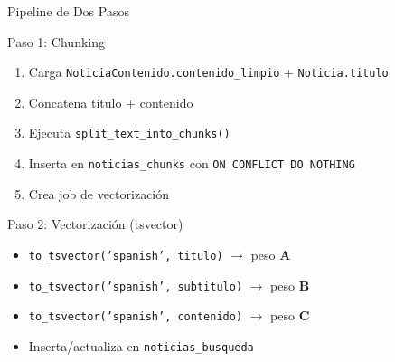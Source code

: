\documentclass[11pt,aspectratio=169,spanish]{beamer}
\begin{document}
\begin{frame}[fragile]{Pipeline de Dos Pasos}
    \begin{block}{Paso 1: Chunking}
        \begin{enumerate}
            \item Carga \texttt{NoticiaContenido.contenido\_limpio} + \texttt{Noticia.titulo}
            \item Concatena título + contenido
            \item Ejecuta \texttt{split\_text\_into\_chunks()}
            \item Inserta en \texttt{noticias\_chunks} con \texttt{ON CONFLICT DO NOTHING}
            \item Crea job de vectorización
        \end{enumerate}
    \end{block}

    \vspace{0.3cm}
    \begin{block}{Paso 2: Vectorización (tsvector)}
        \begin{itemize}
            \item \texttt{to\_tsvector('spanish', titulo)} $\to$ peso \textbf{A}
            \item \texttt{to\_tsvector('spanish', subtitulo)} $\to$ peso \textbf{B}
            \item \texttt{to\_tsvector('spanish', contenido)} $\to$ peso \textbf{C}
            \item Inserta/actualiza en \texttt{noticias\_busqueda}
        \end{itemize}
    \end{block}
\end{frame}
\end{document}
